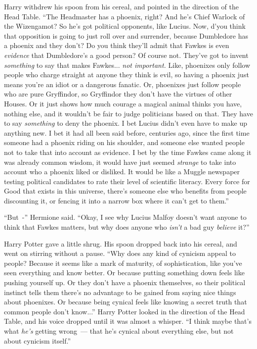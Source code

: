 Harry withdrew his spoon from his cereal, and pointed in the direction of the Head Table. ``The Headmaster has a phoenix, right? And he's Chief Warlock of the Wizengamot? So he's got political opponents, like Lucius. Now, d'you think that opposition is going to just roll over and surrender, because Dumbledore has a phoenix and they don't? Do you think they'll admit that Fawkes is even \emph{evidence} that Dumbledore's a good person? Of course not. They've got to invent \emph{something} to say that makes Fawkes... \emph{not important.} Like, phoenixes only follow people who charge straight at anyone they think is evil, so having a phoenix just means you're an idiot or a dangerous fanatic. Or, phoenixes just follow people who are pure Gryffindor, so Gryffindor they don't have the virtues of other Houses. Or it just shows how much courage a magical animal thinks you have, nothing else, and it wouldn't be fair to judge politicians based on that. They have to say \emph{something} to deny the phoenix. I bet Lucius didn't even have to make up anything new. I bet it had all been said before, centuries ago, since the first time someone had a phoenix riding on his shoulder, and someone else wanted people not to take that into account as evidence. I bet by the time Fawkes came along it was already common wisdom, it would have just seemed \emph{strange} to take into account who a phoenix liked or disliked. It would be like a Muggle newspaper testing political candidates to rate their level of scientific literacy. Every force for Good that exists in this universe, there's someone else who benefits from people discounting it, or fencing it into a narrow box where it can't get to them.''

``But~-'' Hermione said. ``Okay, I see why Lucius Malfoy doesn't want anyone to think that Fawkes matters, but why does anyone who \emph{isn't} a bad guy \emph{believe} it?''

Harry Potter gave a little shrug. His spoon dropped back into his cereal, and went on stirring without a pause. ``Why does any kind of cynicism appeal to people? Because it seems like a mark of maturity, of sophistication, like you've seen everything and know better. Or because putting something down feels like pushing yourself up. Or they don't have a phoenix themselves, so their political instinct tells them there's no advantage to be gained from saying nice things about phoenixes. Or because being cynical feels like knowing a secret truth that common people don't know...'' Harry Potter looked in the direction of the Head Table, and his voice dropped until it was almost a whisper. ``I think maybe that's what \emph{he's} getting wrong~--- that he's cynical about everything else, but not about cynicism itself.''

